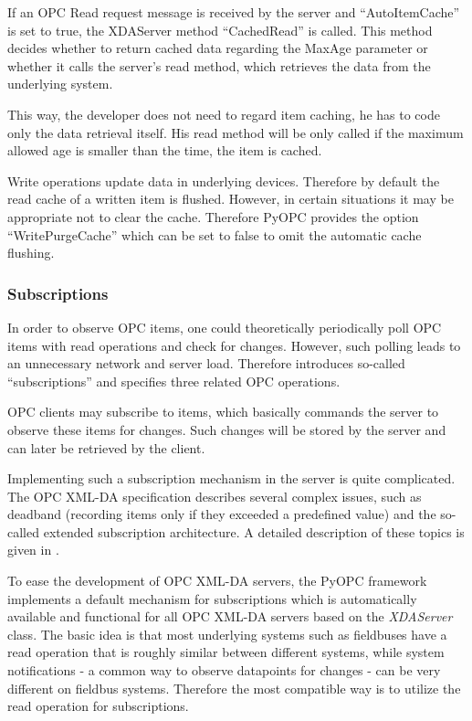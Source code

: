 If an OPC Read request message is received by the server and ``AutoItemCache''
is set to true, the XDAServer method ``CachedRead'' is called. This method
decides whether to return cached data regarding the MaxAge parameter or
whether it calls the server's read method, which retrieves the data from
the underlying system.

This way, the developer does not need to regard item caching, he has
to code only the data retrieval itself. His read method will be only called
if the maximum allowed age is smaller than the time, the item is cached.

Write operations update data in underlying devices. Therefore by
default the read cache of a written item is flushed. However, in
certain situations it may be appropriate not to clear the
cache. Therefore PyOPC provides the option ``WritePurgeCache'' which
can be set to false to omit the automatic cache flushing.

\subsubsection*{Subscriptions}

In order to observe OPC items, one could theoretically periodically
poll OPC items with read operations and check for changes. However,
such polling leads to an unnecessary network and server
load. Therefore \cite{OPCXMLDA} introduces so-called ``subscriptions''
and specifies three related OPC operations.

OPC clients may subscribe to items, which basically commands the
server to observe these items for changes. Such changes will be stored
by the server and can later be retrieved by the client.

Implementing such a subscription mechanism in the server is quite
complicated. The OPC XML-DA specification describes several complex
issues, such as deadband (recording items only if they exceeded a
predefined value) and the so-called extended subscription
architecture. A detailed description of these topics is given in
\cite{OPCXMLDA}.

To ease the development of OPC XML-DA servers, the PyOPC framework
implements a default mechanism for subscriptions which is
automatically available and functional for all OPC XML-DA servers
based on the {\sl XDAServer} class. The basic idea is that most
underlying systems such as fieldbuses have a read operation that is
roughly similar between different systems, while system notifications
- a common way to observe datapoints for changes - can be very
different on fieldbus systems. Therefore the most compatible way is to
utilize the read operation for subscriptions.

